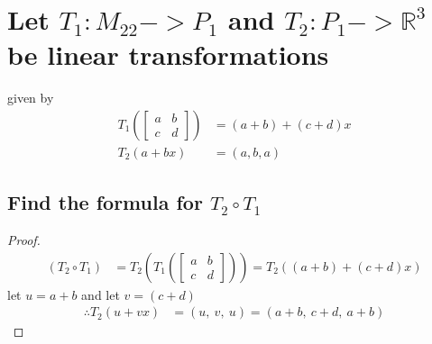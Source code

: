 \documentclass[../main.tex]{subfiles}
\begin{document}
\section[Problem 2]{Let $T_{1}:M_{22}->P_{1}$ and $T_{2}:P_{1}->\mathbb{R}^3$ be linear transformations}
given by
\begin{align*}
  T_{1}\left(\begin{bmatrix}
      a & b \\
      c & d
    \end{bmatrix}\right) & =( a+b) +( c+d) x \\
  T_{2}( a+bx)                                & =( a,b,a)
\end{align*}
\subsection{Find the formula for $T_{2} \circ T_{1}$ }
\begin{proof}

  \begin{equation*}
    \begin{aligned}
      ( T_{2} \circ T_{1}) & =T_{2}\left( T_{1}\left(\begin{bmatrix}
          a & b \\
          c & d
        \end{bmatrix}\right)\right) =T_{2}(( a+b) +( c+d) x)
    \end{aligned}
  \end{equation*}
  let $\displaystyle u=a+b$ and let $\displaystyle v=( c+d)$
  \begin{align*}
    \therefore T_{2}( u+vx) & =( u,\ v,\ u) =( a+b,\ c+d,\ a+b)
  \end{align*}
\end{proof}
\end{document}

